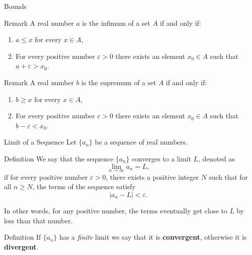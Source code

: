 \documentclass{beamer}
\begin{document}
\begin{frame}{Bounds}
    \begin{block}{Remark}
        A real number $a$ is the infimum of a set $A$ if and only if:
        \begin{enumerate}
            \item $a \le x$ for every $x\in A$,
            \item For every positive number $\varepsilon>0$ there exists an element $x_0\in A$ such that $a+\varepsilon > x_0$.
        \end{enumerate}
    \end{block}
    \pause
    
    \begin{block}{Remark}
        A real number $b$ is the supremum of a set $A$ if and only if:
        \begin{enumerate}
            \item $b \ge x$ for every $x\in A$,
            \item For every positive number $\varepsilon>0$ there exists an element $x_0\in A$ such that $b-\varepsilon < x_0$.
        \end{enumerate}
    \end{block}
\end{frame}




\begin{frame}{Limit of a Sequence}
 Let $\{a_n\}$ be a sequence of real numbers. \pause
    \begin{block}{Definition}
       We say that the sequence $\{a_n\}$ converges to a limit $L$, denoted as $$\lim\limits_{n \to \infty} a_n = L,$$ if for every positive number $\varepsilon>0$, there exists a positive integer $N$ such that for all $n \geq N$, the terms of the sequence satisfy $$|a_n - L| < \varepsilon.$$
    \end{block}

    In other words, for any positive number, the terms eventually get close to $L$ by less than that number.
    \pause
        \begin{block}{Definition}
       If $\{a_n\}$ has a \textit{finite} limit we say that it is \textbf{convergent}, otherwise it is \textbf{divergent}.
    \end{block}

\end{frame}
 
\end{document}
